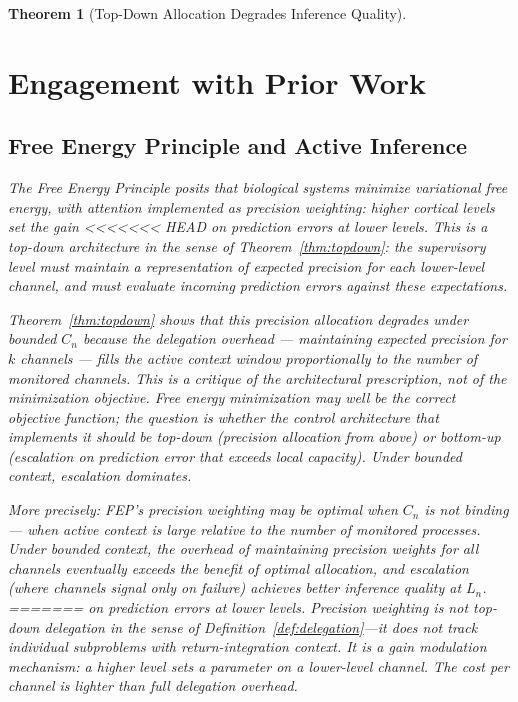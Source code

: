 \documentclass[11pt]{article}
\newtheorem{theorem}{Theorem}
\theoremstyle{definition}
\begin{document}
\begin{theorem}[Top-Down Allocation Degrades Inference Quality]
\section{Engagement with Prior Work}
\label{sec:prior}

\subsection{Free Energy Principle and Active Inference}

The Free Energy Principle \cite{Friston2010,Friston2017} posits that
biological systems minimize variational free energy, with attention
implemented as precision weighting: higher cortical levels set the gain
<<<<<<< HEAD
on prediction errors at lower levels. This is a top-down architecture
in the sense of Theorem~\ref{thm:topdown}: the supervisory level must
maintain a representation of expected precision for each lower-level
channel, and must evaluate incoming prediction errors against these
expectations.

Theorem~\ref{thm:topdown} shows that this precision allocation
degrades under bounded $C_n$ because the delegation overhead ---
maintaining expected precision for $k$ channels --- fills the active
context window proportionally to the number of monitored channels.
This is a critique of the architectural \emph{prescription}, not of the
minimization objective. Free energy minimization may well be the
correct objective function; the question is whether the control
architecture that implements it should be top-down (precision
allocation from above) or bottom-up (escalation on prediction error
that exceeds local capacity). Under bounded context, escalation
dominates.

More precisely: FEP's precision weighting may be optimal when $C_n$ is
not binding --- when active context is large relative to the number of
monitored processes. Under bounded context, the overhead of maintaining
precision weights for all channels eventually exceeds the benefit of
optimal allocation, and escalation (where channels signal only on
failure) achieves better inference quality at $L_n$.
=======
on prediction errors at lower levels. Precision weighting is not
top-down delegation in the sense of Definition~\ref{def:delegation}---it
does not track individual subproblems with return-integration context.
It is a gain modulation mechanism: a higher level sets a parameter on a
lower-level channel. The cost per channel is lighter than full
delegation overhead.


\end{theorem}
\end{document}

